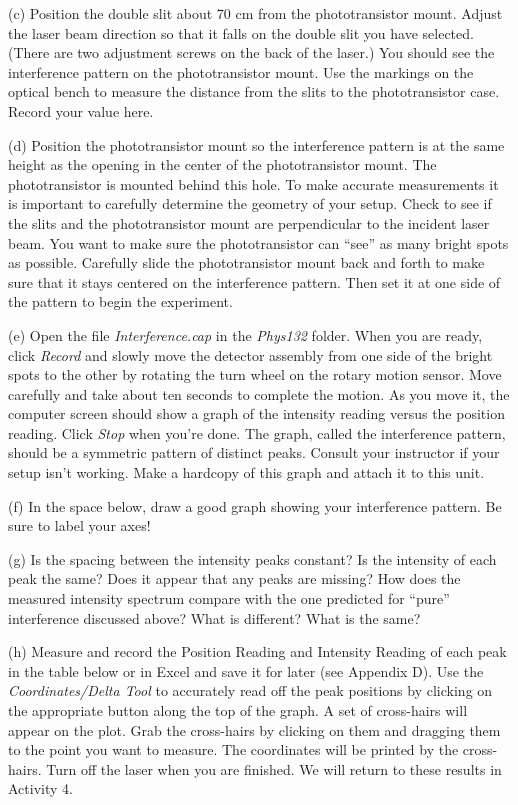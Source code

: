 (c) Position the double slit about 70 cm from the phototransistor mount. Adjust 
the laser beam direction so that it falls on the double slit you have selected. 
(There are two adjustment screws on the back of the laser.) 
You should see the interference pattern on the phototransistor mount. 
Use the markings on the optical bench to measure the distance from the slits
to the phototransistor case.
Record your value here.
\vspace{10mm}

(d) Position the phototransistor mount so the interference pattern
is at the same height as the opening in the center of the phototransistor mount. 
The phototransistor is mounted behind this hole. 
To make accurate measurements it is important to carefully determine the geometry of your setup. 
Check to see if the slits and the phototransistor mount are perpendicular to the incident
laser beam.  You want to make sure the phototransistor can {}``see'' as many
bright spots as possible. Carefully slide the phototransistor mount 
back and forth to make sure that it stays centered on the interference pattern. 
Then set it at one side of the pattern to begin the experiment.

(e) Open the file {\it Interference.cap} in the {\it Phys132} folder. 
When you are ready, click {\it Record} and slowly move the
detector assembly from one side of the bright spots to the other by rotating the turn wheel on the rotary motion
sensor. Move carefully and take about ten seconds to complete the motion. As you move it, the computer screen
should show a graph of the intensity reading versus the position reading. Click {\it Stop} when you’re done. The
graph, called the interference pattern, should be a symmetric pattern of distinct peaks. Consult your instructor
if your setup isn’t working.
Make a hardcopy of this graph and attach it to this unit.

(f) In the space below, draw a good graph showing your interference pattern. Be sure to label your axes!
\vspace{25mm}

(g) Is the spacing between the intensity peaks constant? Is the intensity
of each peak the same? Does it appear that any peaks are missing?
How does the measured intensity spectrum compare with the one predicted
for {}``pure'' interference discussed above? What is different?
What is the same?
\vspace{30mm}

(h) Measure and record the Position Reading and Intensity Reading
of each peak in the table below or in Excel and save it for later (see Appendix D).
Use the
{\it Coordinates/Delta Tool} to accurately read off the peak positions by clicking on the
appropriate button along the top of the graph. A set of cross-hairs will appear on the
plot. Grab the cross-hairs by clicking on them and dragging them to the point you want
to measure.
The coordinates will be printed by the cross-hairs.
Turn off the laser when you are finished.
We will return to these results in Activity 4.

